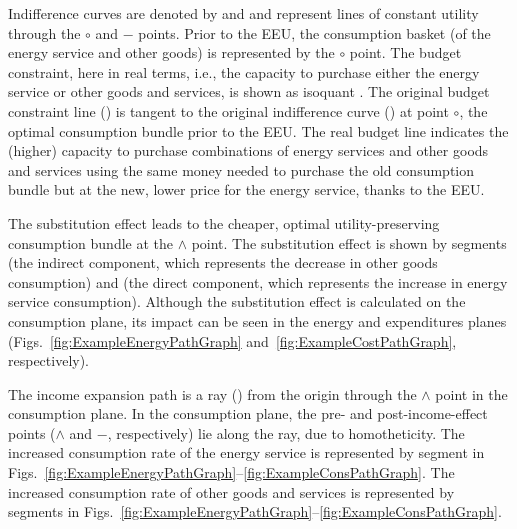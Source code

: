 \documentclass[12pt]{article}\usepackage[]{graphicx}\usepackage[]{xcolor}
\begin{document}
Indifference curves are denoted by \iicirc{} and \iibar{}
and represent lines of constant utility through the $\circ$ and $-$ points. 
Prior to the EEU, the consumption basket (of the energy service and other goods)
is represented by the $\circ$ point. 
The budget constraint,
here in real terms, i.e.,
the capacity to purchase either the energy service or other goods and services,
is shown as isoquant \circcirc{}.
The original budget constraint line (\circcirc{})
is tangent to the original indifference curve 
(\iicirc{}) at point $\circ$, the optimal consumption
bundle prior to the EEU.
The real budget line \starstar{}
indicates the (higher) capacity to purchase 
combinations of energy services and other goods and services
using the same money needed to purchase
the old consumption bundle but at the new, lower price
for the energy service,
thanks to the EEU.

The substitution effect leads to the cheaper, optimal
utility-preserving
consumption bundle at the $\wedge$ point. 
The substitution effect is shown by segments
\starc{} (the indirect component, which represents the decrease in other goods consumption) and
\chat{} (the direct component, which represents the increase in energy service consumption).
Although the substitution effect is calculated 
on the consumption plane, 
its impact 
can be seen in
the energy and expenditures planes 
(Figs.~\ref{fig:ExampleEnergyPathGraph}
and~\ref{fig:ExampleCostPathGraph}, respectively).

The income expansion path is a ray (\rr{}) from the origin through the $\wedge$ point
in the consumption plane.
In the consumption plane, the pre- and post-income-effect 
points ($\wedge$ and $-$, respectively)
lie along the \rr{} ray, due to homotheticity.
The increased consumption rate of the energy service is 
represented by segment \hatd{} 
in Figs.~\ref{fig:ExampleEnergyPathGraph}--\ref{fig:ExampleConsPathGraph}.
The increased consumption rate of other goods and services is 
represented by segments \dbar{} 
in Figs.~\ref{fig:ExampleEnergyPathGraph}--\ref{fig:ExampleConsPathGraph}.
\end{document}
